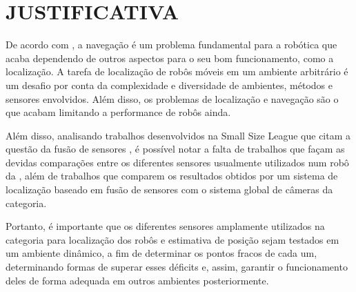 \documentclass[acronym, symbols, table]{fei}
\begin{document}
%		
%		
%		
		
	\section{JUSTIFICATIVA}
	
		De acordo com \textcite{alatise2020review}, a navegação é um problema fundamental para a robótica que acaba dependendo de outros aspectos para o seu bom funcionamento, como a localização. A tarefa de localização de robôs móveis em um ambiente arbitrário é um desafio por conta da complexidade e diversidade de ambientes, métodos e sensores envolvidos. Além disso, os problemas de localização e navegação são o que acabam limitando a performance de robôs ainda.
		
		Além disso, analisando trabalhos desenvolvidos na Small Size League que citam a questão da fusão de sensores \cite{Ryll2013TIGERSM, ubc_thunderbots_2017, parsian_2015, parsian_2019, mrl_2020, ubc_thunderbots_2015, immortals_2023}, é possível notar a falta de trabalhos que façam as devidas comparações entre os diferentes sensores usualmente utilizados num robô da , além de trabalhos que comparem os resultados obtidos por um sistema de localização baseado em fusão de sensores com o sistema global de câmeras da categoria.
		
		Portanto, é importante que os diferentes sensores amplamente utilizados na categoria  para localização dos robôs e estimativa de posição sejam testados em um ambiente dinâmico, a fim de determinar os pontos fracos de cada um, determinando formas de superar esses déficits e, assim, garantir o funcionamento deles de forma adequada em outros ambientes posteriormente.
	
\end{document}
